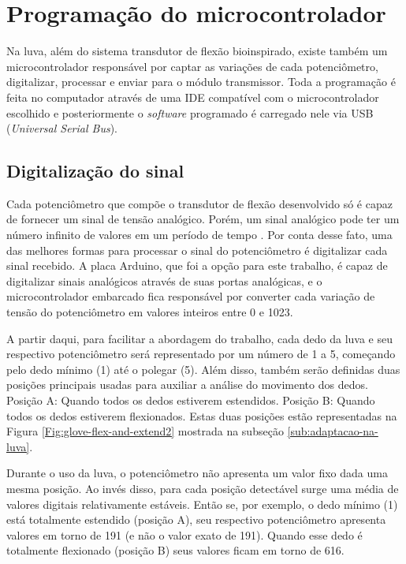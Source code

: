 \documentclass[
	12pt,				%
	openright,			%
	oneside,			%
	a4paper,			%
	english,			%
	brazil				%
	]{abntex2}
\begin{document}
	
		\section{Programação do microcontrolador}

		Na luva, além do sistema transdutor de flexão bioinspirado, existe também um microcontrolador responsável por captar as variações de cada potenciômetro, digitalizar, processar e enviar para o módulo transmissor. Toda a programação é feita no computador através de uma IDE compatível com o microcontrolador escolhido e posteriormente o \textit{software} programado é carregado nele via USB (\textit{Universal Serial Bus}).  
		
		\subsection{Digitalização do sinal}

		Cada potenciômetro que compõe o transdutor de flexão desenvolvido só é capaz de fornecer um sinal de tensão analógico. Porém, um sinal analógico pode ter um número infinito de valores em um período de tempo \cite{forouzan2009comunicacao}. Por conta desse fato, uma das melhores formas para processar o sinal do potenciômetro é digitalizar cada sinal recebido. A placa Arduino, que foi a opção para este trabalho, é capaz de digitalizar sinais analógicos através de suas portas analógicas, e o microcontrolador embarcado fica responsável por converter cada variação de tensão do potenciômetro em valores inteiros entre 0 e 1023. 

		A partir daqui, para facilitar a abordagem do trabalho, cada dedo da luva e seu respectivo potenciômetro será representado por um número de 1 a 5, começando pelo dedo mínimo (1) até o polegar (5). Além disso, também serão definidas duas posições principais usadas para auxiliar a análise do movimento dos dedos. Posição A: Quando todos os dedos estiverem estendidos. Posição B: Quando todos os dedos estiverem flexionados. Estas duas posições estão representadas na Figura \ref{Fig:glove-flex-and-extend2} mostrada na subseção \ref{sub:adaptacao-na-luva}.

		Durante o uso da luva, o potenciômetro não apresenta um valor fixo dada uma mesma posição. Ao invés disso, para cada posição detectável surge uma média de valores digitais relativamente estáveis. Então se, por exemplo, o dedo mínimo (1) está totalmente estendido (posição A), seu respectivo potenciômetro apresenta valores em torno de 191 (e não o valor exato de 191). Quando esse dedo é totalmente flexionado (posição B) seus valores ficam em torno de 616.
\end{document}
